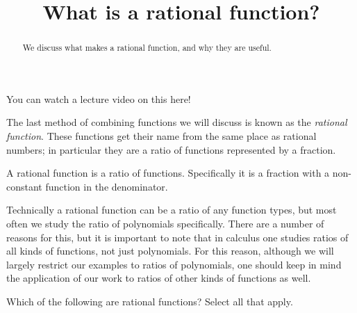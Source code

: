 \documentclass{ximera}
\title{What is a rational function?}
\begin{document}
\begin{abstract}
    We discuss what makes a rational function, and why they are useful.
\end{abstract}
\maketitle

You can watch a lecture video on this here!


The last method of combining functions we will discuss is known as the \textit{rational function}. These functions get their name from the same place as rational numbers; in particular they are a ratio of functions represented by a fraction.

\begin{definition}
    A rational function is a ratio of functions. Specifically it is a fraction with a non-constant function in the denominator.
\end{definition}

Technically a rational function can be a ratio of any function types, but most often we study the ratio of polynomials specifically. There are a number of reasons for this, but it is important to note that in calculus one studies ratios of all kinds of functions, not just polynomials. For this reason, although we will largely restrict our examples to ratios of polynomials, one should keep in mind the application of our work to ratios of other kinds of functions as well.

\begin{example}
    Which of the following are rational functions? Select all that apply.
    \begin{selectAll}
    \end{selectAll}
\end{example}
\end{document}
